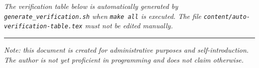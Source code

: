 \medskip
\noindent\small\textit{The verification table below is automatically generated
	by \texttt{generate\_verification.sh} when \texttt{make all}
	is executed. The file \texttt{content/auto-verification-table.tex}
	must not be edited manually.}





\medskip
\noindent\rule{\textwidth}{0.4pt}
\medskip

\noindent\textit{Note: this document is created for administrative
	purposes and self-introduction. The author is not yet proficient in
	programming and does not claim otherwise.}
